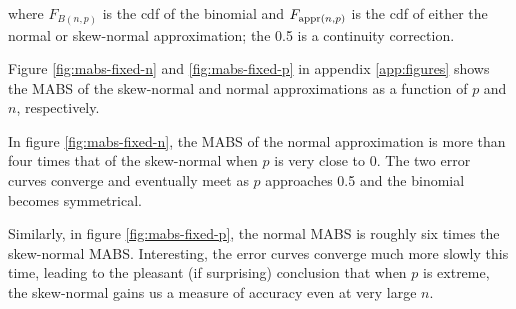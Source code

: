 where $F_{B(n,p)}$ is the cdf of the binomial and $F_{\textnormal{appr}(n,p)}$
is the cdf of either the normal or skew-normal approximation; the 0.5 is a
continuity correction.

Figure \ref{fig:mabs-fixed-n} and \ref{fig:mabs-fixed-p} in appendix
\ref{app:figures} shows the MABS of the skew-normal and normal approximations
as a function of $p$ and $n$, respectively.

In figure \ref{fig:mabs-fixed-n}, the MABS of the normal approximation is more
than four times that of the skew-normal when $p$ is very close to 0. The two
error curves converge and eventually meet as $p$ approaches 0.5 and the
binomial becomes symmetrical.

Similarly, in figure \ref{fig:mabs-fixed-p}, the normal MABS is roughly six
times the skew-normal MABS. Interesting, the error curves converge much more
slowly this time, leading to the pleasant (if surprising) conclusion that when
$p$ is extreme, the skew-normal gains us a measure of accuracy even at very
large $n$.
